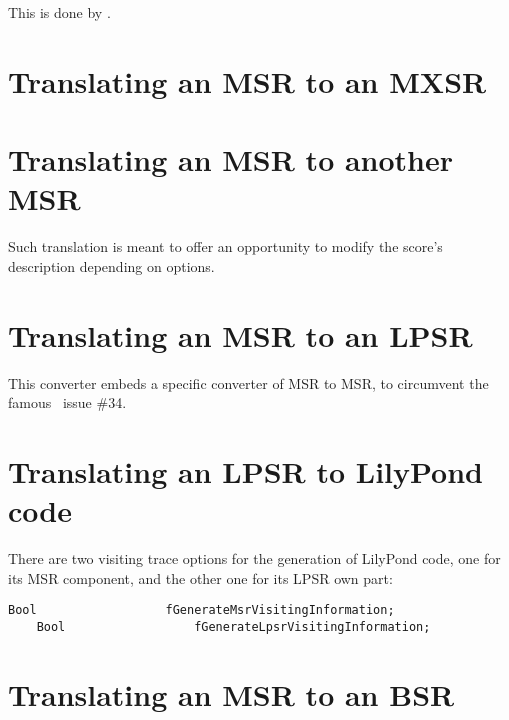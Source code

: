 This is done by .


\section{Translating an MSR to an MXSR}


\section{Translating an MSR to another MSR}

Such translation is meant to offer an opportunity to modify the score's description depending on options.


\section{Translating an MSR to an LPSR}

This converter embeds a specific converter of MSR to MSR, to circumvent the famous \lily\ issue \#34.


\section{Translating an LPSR to LilyPond code}




There are two visiting trace options for the generation of LilyPond code, one for its MSR component, and the other one for its LPSR own part:
\begin{lstlisting}[language=CPlusPlus]
    Bool                  fGenerateMsrVisitingInformation;
    Bool                  fGenerateLpsrVisitingInformation;
\end{lstlisting}


\section{Translating an MSR to an BSR}


